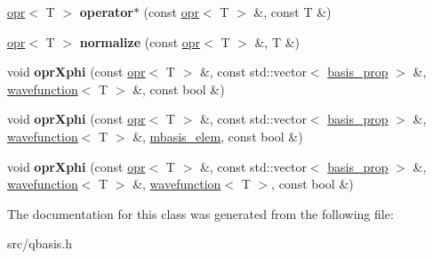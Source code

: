 \begin{DoxyCompactItemize}
\hyperlink{classqbasis_1_1opr}{opr}$<$ T $>$ {\bfseries operator$\ast$} (const \hyperlink{classqbasis_1_1opr}{opr}$<$ T $>$ \&, const T \&)
\item 
\mbox{\label{classqbasis_1_1opr_a5683526d3057a75220d1207c8db1b867}} 
\hyperlink{classqbasis_1_1opr}{opr}$<$ T $>$ {\bfseries normalize} (const \hyperlink{classqbasis_1_1opr}{opr}$<$ T $>$ \&, T \&)
\item 
\mbox{\label{classqbasis_1_1opr_a938733638028a298418622998077db12}} 
void {\bfseries opr\+Xphi} (const \hyperlink{classqbasis_1_1opr}{opr}$<$ T $>$ \&, const std\+::vector$<$ \hyperlink{classqbasis_1_1basis__prop}{basis\+\_\+prop} $>$ \&, \hyperlink{classqbasis_1_1wavefunction}{wavefunction}$<$ T $>$ \&, const bool \&)
\item 
\mbox{\label{classqbasis_1_1opr_ac881f7f2c19ae767ca695ec696526f3b}} 
void {\bfseries opr\+Xphi} (const \hyperlink{classqbasis_1_1opr}{opr}$<$ T $>$ \&, const std\+::vector$<$ \hyperlink{classqbasis_1_1basis__prop}{basis\+\_\+prop} $>$ \&, \hyperlink{classqbasis_1_1wavefunction}{wavefunction}$<$ T $>$ \&, \hyperlink{classqbasis_1_1mbasis__elem}{mbasis\+\_\+elem}, const bool \&)
\item 
\mbox{\label{classqbasis_1_1opr_a453118abdd7bb3e60a43d8bf6b871562}} 
void {\bfseries opr\+Xphi} (const \hyperlink{classqbasis_1_1opr}{opr}$<$ T $>$ \&, const std\+::vector$<$ \hyperlink{classqbasis_1_1basis__prop}{basis\+\_\+prop} $>$ \&, \hyperlink{classqbasis_1_1wavefunction}{wavefunction}$<$ T $>$ \&, \hyperlink{classqbasis_1_1wavefunction}{wavefunction}$<$ T $>$, const bool \&)
\end{DoxyCompactItemize}


The documentation for this class was generated from the following file\+:\begin{DoxyCompactItemize}
\item 
src/qbasis.\+h\end{DoxyCompactItemize}
